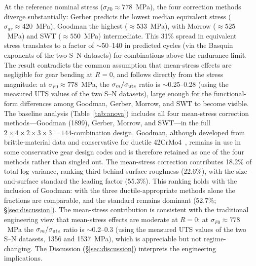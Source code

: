 \documentclass[twocolumn,12pt,a4paper]{article}
\begin{document}
At the reference nominal stress ($\sigma_{F0} \approx 778$~MPa), the
four correction methods diverge substantially: Gerber predicts the
lowest median equivalent stress ($\sigma_{ar} \approx 420$~MPa),
Goodman the highest ($\approx 533$~MPa), with Morrow
($\approx 525$~MPa) and SWT ($\approx 550$~MPa) intermediate. This
31\% spread in equivalent stress translates to a factor of
$\sim$50--140 in predicted cycles (via the Basquin exponents of the
two S--N datasets) for combinations above the endurance limit. The
result contradicts the common assumption that mean-stress effects are
negligible for gear bending at $R=0$, and follows directly from the
stress magnitude: at $\sigma_{F0} \approx 778$~MPa, the
$\sigma_m/\sigma_{\rm uts}$ ratio is $\sim$0.25--0.28 (using the
measured UTS values of the two S--N datasets), large enough for the
functional-form differences among Goodman, Gerber, Morrow, and SWT to
become visible.
The baseline analysis (Table~\ref{tab:anova}) includes all four
mean-stress correction methods---Goodman (1899), Gerber, Morrow, and
SWT---in the full $2\times4\times2\times3\times3 = 144$-combination
design. Goodman, although developed from brittle-material data and
conservative for ductile 42CrMo4~\cite{stephens2001}, remains in use
in some conservative gear design codes and is therefore retained as
one of the four methods rather than singled out. The mean-stress
correction contributes 18.2\% of total log-variance, ranking third
behind surface roughness (22.6\%), with the size-and-surface standard
the leading factor (55.3\%). This ranking holds with the inclusion of
Goodman: with the three ductile-appropriate methods alone the
fractions are comparable, and the standard remains dominant
(52.7\%; \S\ref{sec:discussion}). The mean-stress contribution is
consistent with the traditional engineering view that mean-stress
effects are moderate at $R=0$: at $\sigma_{F0} \approx 778$~MPa the
$\sigma_m/\sigma_{\rm uts}$ ratio is $\sim$0.2--0.3 (using the
measured UTS values of the two S--N datasets, 1356 and 1537~MPa),
which is appreciable but not regime-changing. The Discussion
(\S\ref{sec:discussion}) interprets the engineering implications.
\end{document}
